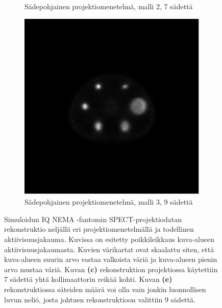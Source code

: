 \begin{figure}[H]
\begin{subfigure}[b]{.25\textwidth}
        \caption{Sädepohjainen projektiomenetelmä, malli 2, 7 sädettä}
    \end{subfigure}%
    \hspace{.075\textwidth}%
    \begin{subfigure}[b]{.25\textwidth}
        \includegraphics[width=\linewidth]{kuvat/nema_rekonstruktio_proj1_malli3_nRay9.pdf}
        \caption{Sädepohjainen projektiomenetelmä, malli 3, 9 sädettä}
    \end{subfigure}
    \caption{Simuloidun IQ NEMA -fantomin SPECT-projektiodatan rekonstruktio neljällä eri projektiomenetelmällä ja todellinen aktiivisuusjakauma. Kuvissa on esitetty poikkileikkaus kuva-alueen aktiivisuusjakaumasta. Kuvien värikartat ovat skaalattu siten, että kuva-alueen suurin arvo vastaa valkoista väriä ja kuva-alueen pienin arvo mustaa väriä. Kuvan \textbf{(c)} rekonstruktion projektiossa käytettiin 7 sädettä yhtä kollimaattorin reikää kohti. Kuvan \textbf{(e)} rekonstruktiossa säteiden määrä voi olla vain jonkin luonnollisen luvun neliö, josta johtuen rekonstruktioon valittiin 9 sädettä.}
    \label{fig:nema-rekonstruktiot}
\end{figure}

